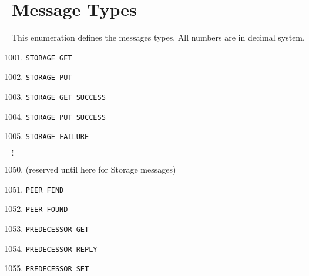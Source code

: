 \documentclass[a4paper, 11pt]{article}
\begin{document}



\pagebreak

\renewcommand\thesection{\Alph{section}}
\setcounter{section}{0}
\section{Message Types}

This enumeration defines the messages types. All numbers are in decimal system.

\begin{enumerate}
	\setcounter{enumi}{1000}
	\item \texttt{STORAGE GET}
	\item \texttt{STORAGE PUT}
	\item \texttt{STORAGE GET SUCCESS}
	\item \texttt{STORAGE PUT SUCCESS}
	\item \texttt{STORAGE FAILURE}
\end{enumerate}

$\vdots$

\begin{enumerate}
	\setcounter{enumi}{1049}
	\item (reserved until here for Storage messages)
	\item \texttt{PEER FIND}
	\item \texttt{PEER FOUND}
	\item \texttt{PREDECESSOR GET}
	\item \texttt{PREDECESSOR REPLY}
	\item \texttt{PREDECESSOR SET}
\end{enumerate}
\end{document}
